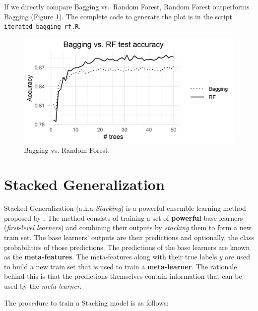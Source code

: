 \documentclass[
  11pt,
]{krantz}
\begin{document}
If we directly compare Bagging vs.~Random Forest, Random Forest outperforms Bagging (Figure \ref{fig:iteratedBaggingRF}). The complete code to generate the plot is in the script \texttt{iterated\_bagging\_rf.R}.

\begin{figure}

{\centering \includegraphics[width=1\linewidth]{images/iterated_bagging_rf} 

}

\caption{Bagging vs. Random Forest.}\label{fig:iteratedBaggingRF}
\end{figure}

\hypertarget{stacked-generalization}{%
\section{Stacked Generalization}\label{stacked-generalization}}

Stacked Generalization (a.k.a \emph{Stacking}) is a powerful ensemble learning method proposed by \citet{wolpertStacked}. The method consists of training a set of \textbf{powerful} base learners (\emph{first-level learners}) and combining their outputs by \emph{stacking} them to form a new train set. The base learners' outputs are their predictions and optionally, the class probabilities of those predictions. The predictions of the base learners are known as the \textbf{meta-features}. The meta-features along with their true labels \(y\) are used to build a new train set that is used to train a \textbf{meta-learner}. The rationale behind this is that the predictions themselves contain information that can be used by the \emph{meta-learner}.

The procedure to train a Stacking model is as follows:
\end{document}
